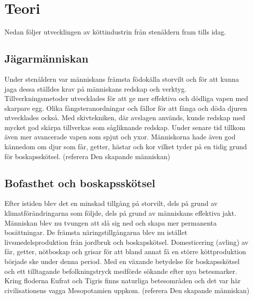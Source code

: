 \section{Teori}
Nedan följer utvecklingen av köttindustrin från stenåldern fram tills idag.

\subsection{Jägarmänniskan}
Under stenåldern var människans främsta födokälla storvilt och för att kunna jaga dessa ställdes krav på människans redskap och verktyg. Tillverkningsmetoder utvecklades för att ge mer effektiva och dödliga vapen med skarpare egg. Olika fångsteranordningar och fällor för att fånga och döda djuren utvecklades också. Med skivtekniken, där avslagen används, kunde redskap med mycket god skärpa tillverkas som sågliknande redskap. Under senare tid tillkom även mer avancerade vapen som spjut och yxor.  
\newline
\newline
Människorna hade även god kännedom om djur som får, getter, hästar och kor vilket tyder på en tidig grund för boskapsskötsel. 
\newline
(referera Den skapande människan)
     
\subsection{Bofasthet och boskapsskötsel}
Efter istiden blev det en minskad tillgång på storvilt, dels på grund av klimatförändringarna som följde, dels på grund av människans effektiva jakt. Människan blev nu tvungen att slå sig ned och skapa mer permanenta bosättningar. De främsta näringstillgångarna blev nu istället livsmedelsproduktion från jordbruk och boskapskötsel. Domesticering (avling) av får, getter, nötboskap och grisar för att bland annat få en större köttproduktion började ske under denna period. 
\newline
\newline
Med en växande betydelse för boskapsskötsel och ett tilltagande befolkningstryck medförde sökande efter nya betesmarker. Kring floderna Eufrat och Tigris finns naturliga betesområden och det var här civilisationens vagga Mesopotamien uppkom.   
\newline
\newline
(referera Den skapande människan)

